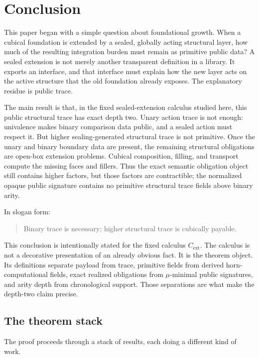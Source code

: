 \section{Conclusion}
\label{sec:conclusion}

This paper began with a simple question about foundational growth.  When a cubical
foundation is extended by a sealed, globally acting structural layer, how much of the
resulting integration burden must remain as primitive public data?  A sealed extension is
not merely another transparent definition in a library.  It exports an interface, and that
interface must explain how the new layer acts on the active structure that the old foundation
already exposes.  The explanatory residue is public trace.

The main result is that, in the fixed sealed-extension calculus studied here, this public
structural trace has exact depth two.  Unary action trace is not enough: univalence makes
binary comparison data public, and a sealed action must respect it.  But higher
sealing-generated structural trace is not primitive.  Once the unary and binary boundary data
are present, the remaining structural obligations are open-box extension problems.  Cubical
composition, filling, and transport compute the missing faces and fillers.  Thus the exact
semantic obligation object still contains higher factors, but those factors are contractible;
the normalized opaque public signature contains no primitive structural trace fields above
binary arity.

In slogan form:
\begin{quote}
Binary trace is necessary; higher structural trace is cubically payable.
\end{quote}

This conclusion is intentionally stated for the fixed calculus \(C_{\mathrm{ext}}\).  The
calculus is not a decorative presentation of an already obvious fact.  It is the theorem
object.  Its definitions separate payload from trace, primitive fields from derived
horn-computational fields, exact realized obligations from \(\mu\)-minimal public signatures,
and arity depth from chronological support.  Those separations are what make the depth-two
claim precise.

\subsection{The theorem stack}
\label{subsec:conclusion-theorem-stack}

The proof proceeds through a stack of results, each doing a different kind of work.

